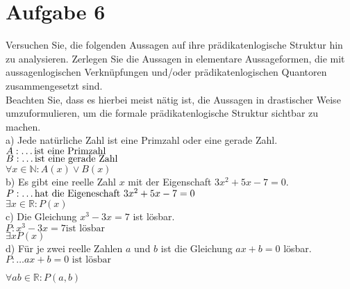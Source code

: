 \section*{Aufgabe 6}

Versuchen Sie, die folgenden Aussagen auf ihre prädikatenlogische Struktur hin zu analysieren. Zerlegen Sie die Aussagen in elementare Aussageformen, die mit aussagenlogischen Verknüpfungen und/oder prädikatenlogischen Quantoren zusammengesetzt sind.\\

Beachten Sie, dass es hierbei meist nätig ist, die Aussagen in drastischer Weise umzuformulieren, um die formale prädikatenlogische Struktur sichtbar zu machen.\\

a) Jede natürliche Zahl ist eine Primzahl oder eine gerade Zahl.\\

$A: \text{\dots ist eine Primzahl}$\\

$B: \text{\dots ist eine gerade Zahl}$\\

$\forall x \in \mathbb{N} : A(x) \lor B(x)$\\

b) Es gibt eine reelle Zahl $x$ mit der Eigenschaft $3x^2 + 5x - 7 = 0$.\\

$P: \text{\dots hat die Eigeneschaft } 3x^2 + 5x - 7 = 0$\\

$\exists x \in \mathbb{R} : P(x)$\\

c) Die Gleichung $x^3 - 3x = 7$ ist lösbar.\\

$P: x^3 - 3x = 7 \text{ist lösbar}$\\

$\exists x P(x)$\\

d) Für je zwei reelle Zahlen $a$ und $b$ ist die Gleichung $ax + b = 0$ lösbar.\\

$P: \dots ax + b = 0 \text{ ist lösbar}$

$\forall ab \in \mathbb{R} : P(a,b)$